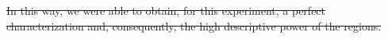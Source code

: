 \documentclass[journal]{IEEEtran}
\providecommand{\DIFdeltex}[1]{{\protect\color{red}\sout{#1}}}                      %
\providecommand{\DIFdel}[1]{\texorpdfstring{\DIFdeltex{#1}}{}} %
\begin{document}

\DIFdel{In this way, we were able to obtain, for this experiment, a perfect characterization and, consequently, the high descriptive power of the regions.
}%
\end{document}
